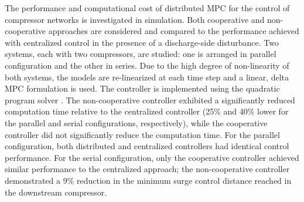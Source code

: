 The performance and computational cost of distributed MPC for the control of compressor networks is investigated in simulation.
Both cooperative and non-cooperative approaches are considered and compared to the performance achieved with centralized control in the presence of a discharge-side disturbance.
Two systems, each with two compressors, are studied: one is arranged in parallel configuration and the other in series.
Due to the high degree of non-linearity of both systems, the models are re-linearized at each time step and a linear, delta MPC formulation is used.
The controller is implemented using the quadratic program solver \qpoases{}.
The non-cooperative controller exhibited a significantly reduced computation time relative to the centralized controller (25\% and 40\% lower for the parallel and serial configurations, respectively), while the cooperative controller did not significantly reduce the computation time.
For the parallel configuration, both distributed and centralized controllers had identical control performance.
For the serial configuration, only the cooperative controller achieved similar performance to the centralized approach; the non-cooperative controller demonstrated a 9\% reduction in the minimum surge control distance reached in the downstream compressor.
